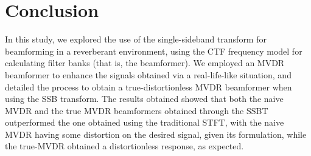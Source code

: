 \section{Conclusion}

In this study, we explored the use of the single-sideband transform for beamforming in a reverberant environment, using the CTF frequency model for calculating filter banks (that is, the beamformer). We employed an MVDR beamformer to enhance the signals obtained via a real-life-like situation, and detailed the process to obtain a true-distortionless MVDR beamformer when using the SSB transform. The results obtained showed that both the naive MVDR and the true MVDR beamformers obtained through the SSBT outperformed the one obtained using the traditional STFT, with the naive MVDR having some distortion on the desired signal, given its formulation, while the true-MVDR obtained a distortionless response, as expected.